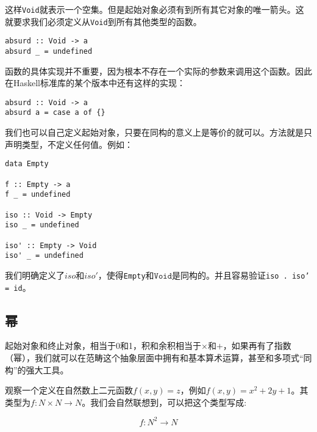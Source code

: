 \documentclass{article}
\begin{document}
\begin{example}
这样\texttt{Void}就表示一个空集。但是起始对象必须有到所有其它对象的唯一箭头。这就要求我们必须定义从\texttt{Void}到所有其他类型的函数。

\begin{lstlisting}
absurd :: Void -> a
absurd _ = undefined
\end{lstlisting}

函数的具体实现并不重要，因为根本不存在一个实际的参数来调用这个函数。因此在Haskell标准库的某个版本中还有这样的实现：

\begin{lstlisting}
absurd :: Void -> a
absurd a = case a of {}
\end{lstlisting}

我们也可以自己定义起始对象，只要在同构的意义上是等价的就可以。方法就是只声明类型，不定义任何值。例如：

\begin{lstlisting}
data Empty

f :: Empty -> a
f _ = undefined

iso :: Void -> Empty
iso _ = undefined

iso' :: Empty -> Void
iso' _ = undefined
\end{lstlisting}

我们明确定义了$iso$和$iso'$，使得\texttt{Empty}和$\texttt{Void}$是同构的。并且容易验证\texttt{iso . iso' = id}。
\end{example}

\begin{Exercise}
\end{Exercise}

\subsection{幂}

起始对象和终止对象，相当于0和1，积和余积相当于$\times$和$+$，如果再有了指数（幂），我们就可以在范畴这个抽象层面中拥有和基本算术运算，甚至和多项式“同构”的强大工具。

观察一个定义在自然数上二元函数$f(x, y) = z$，例如$f(x, y) = x^2 + 2y + 1$。其类型为$f: N \times N \to N$。我们会自然联想到，可以把这个类型写成:

\[
f : N^2 \to N
\]
\end{document}
